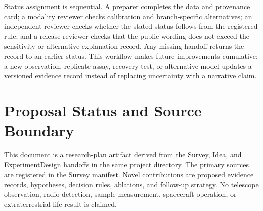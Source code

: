 \documentclass[conference]{IEEEtran}
\begin{document}
Status assignment is sequential. A preparer completes the data and provenance card; a modality reviewer checks calibration and branch-specific alternatives; an independent reviewer checks whether the stated status follows from the registered rule; and a release reviewer checks that the public wording does not exceed the sensitivity or alternative-explanation record. Any missing handoff returns the record to an earlier status. This workflow makes future improvements cumulative: a new observation, replicate assay, recovery test, or alternative model updates a versioned evidence record instead of replacing uncertainty with a narrative claim.

\section{Proposal Status and Source Boundary}

This document is a research-plan artifact derived from the Survey, Idea, and ExperimentDesign handoffs in the same project directory. The primary sources are registered in the Survey manifest. Novel contributions are proposed evidence records, hypotheses, decision rules, ablations, and follow-up strategy. No telescope observation, radio detection, sample measurement, spacecraft operation, or extraterrestrial-life result is claimed.
\end{document}
